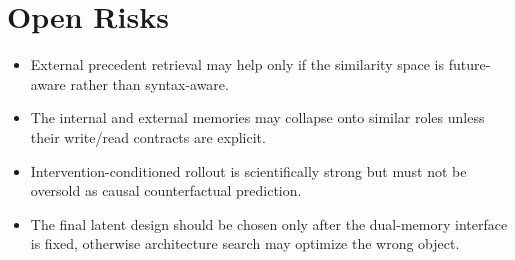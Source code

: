 \documentclass[11pt]{article}
\begin{document}
\section{Open Risks}

\begin{itemize}
    \item External precedent retrieval may help only if the similarity space is future-aware rather than syntax-aware.
    \item The internal and external memories may collapse onto similar roles unless their write/read contracts are explicit.
    \item Intervention-conditioned rollout is scientifically strong but must not be oversold as causal counterfactual prediction.
    \item The final latent design should be chosen only after the dual-memory interface is fixed, otherwise architecture search may optimize the wrong object.
\end{itemize}



\end{document}
